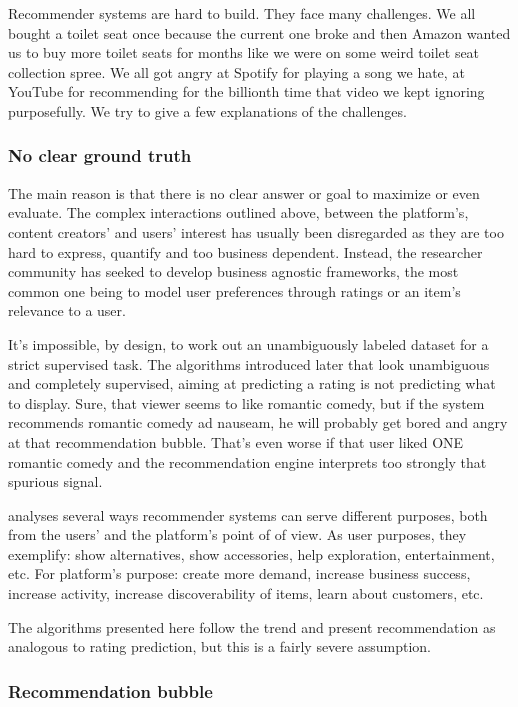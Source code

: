 Recommender systems are hard to build. They face many challenges. We all bought a toilet seat once because the current one broke and then Amazon wanted us to buy more toilet seats for months like we were on some weird toilet seat collection spree. We all got angry at Spotify for playing a song we hate, at YouTube for recommending for the billionth time that video we kept ignoring purposefully. We try to give a few explanations of the challenges.

\subsubsection{No clear ground truth}

The main reason is that there is no clear answer or goal to maximize or even evaluate. The complex interactions outlined above, between the platform's, content creators' and users' interest has usually been disregarded as they are too hard to express, quantify and too business dependent. Instead, the researcher community has seeked to develop business agnostic frameworks, the most common one being to model user preferences through ratings or an item's relevance to a user.

It's impossible, by design, to work out an unambiguously labeled dataset for a strict supervised task. The algorithms introduced later that look unambiguous and completely supervised, aiming at predicting a rating is not predicting what to display. Sure, that viewer seems to like romantic comedy, but if the system recommends romantic comedy ad nauseam, he will probably get bored and angry at that recommendation bubble. That's even worse if that user liked ONE romantic comedy and the recommendation engine interprets too strongly that spurious signal.

\cite{recpurpose} analyses several ways recommender systems can serve different purposes, both from the users' and the platform's point of of view. As user purposes, they exemplify: show alternatives, show accessories, help exploration, entertainment, etc. For platform's purpose: create more demand, increase business success, increase activity, increase discoverability of items, learn about customers, etc.

The algorithms presented here follow the trend and present recommendation as analogous to rating prediction, but this is a fairly severe assumption.

\subsubsection{Recommendation bubble}

